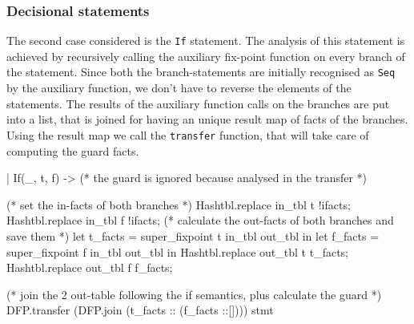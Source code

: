 \documentclass[a4paper]{article}   %
\begin{document}
\subsubsection{Decisional statements}
The second case considered is the \texttt{If} statement. The analysis of this statement 
is achieved by recursively calling 
%
the auxiliary fix-point function on every branch of the statement. Since both the branch-statements are initially recognised as \texttt{Seq} by the auxiliary function, 
we don't have to reverse the elements of the statements. 
%
The results of the auxiliary function calls on the branches are put into a list, that is joined for having an unique result map of facts of the branches. Using the result map we call the \texttt{transfer} function, that will take care of computing the guard facts.

\begin{ocaml}
| If(_, t, f) -> 
	(* the guard is ignored because analysed in the transfer *)
				
	(* set the in-facts of both branches *)
	Hashtbl.replace in_tbl t !ifacts;
	Hashtbl.replace in_tbl f !ifacts;
	(* calculate the out-facts of both branches and save them *)
	let t_facts = super_fixpoint t in_tbl out_tbl in
	let f_facts = super_fixpoint f in_tbl out_tbl in
	Hashtbl.replace out_tbl t t_facts;
	Hashtbl.replace out_tbl f f_facts;

	(* join the 2 out-table following the if semantics, plus calculate the guard *)
	DFP.transfer (DFP.join (t_facts :: (f_facts ::[]))) stmt 
\end{ocaml}
\end{document}
